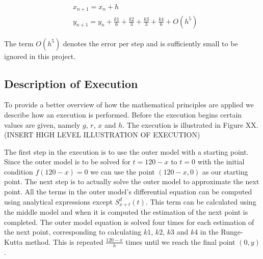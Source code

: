 \begin{align}
\nonumber& x_{n + 1} = x_n + h \\
&y_{n + 1} = y_n + \frac{k1}{6} + \frac{k2}{3} + \frac{k3}{3} + \frac{k4}{6} + O(h^5)
\end{align}

The term $O(h^5)$ denotes the error per step and is sufficiently small to be ignored in this project.

\subsection{Description of Execution}
	To provide a better overview of how the mathematical principles are applied we describe how an execution is performed. Before the execution begins certain values are given, namely $g$, $r$, $x$ and $h$. The execution is illustrated in Figure XX. \\
	
	(INSERT HIGH LEVEL ILLUSTRATION OF EXECUTION)
	
	
	The first step in the execution is to use the outer model with a starting point. Since the outer model is to be solved for $t=120-x$ to $t=0$ with the initial condition $f(120-x)=0$ we can use the point $(120-x, 0)$ as our starting point. The next step is to actually solve the outer model to approximate the next point. All the terms in the outer model's differential equation can be computed using analytical expressions except $S_{x+t}^d (t)$. This term can be calculated using the middle model and when it is computed the estimation of the next point is completed. The outer model equation is solved four times for each estimation of the next point, corresponding to calculating $k1$, $k2$, $k3$ and $k4$ in the Runge-Kutta method. This is repeated $\frac{120-x}{h}$ times until we reach the final point $(0,y)$. \\
	
